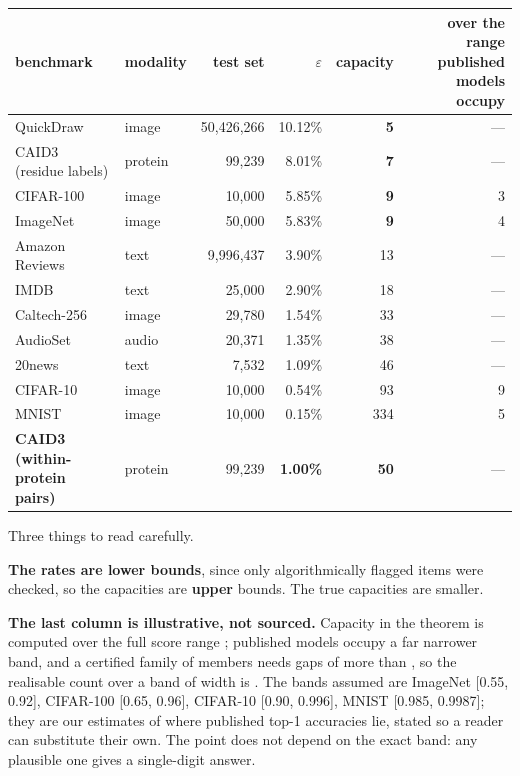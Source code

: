 \begin{center}\footnotesize
\begin{tabular}{llrrrr}
\toprule
\textbf{benchmark} & \textbf{modality} & \textbf{test set} & \textbf{$\varepsilon$} & \textbf{\textbf{capacity}} & \textbf{over the range published models occupy} \\
\midrule
QuickDraw & image & 50,426,266 & 10.12\% & \textbf{5} & --- \\
CAID3 (residue labels) & protein & 99,239 & 8.01\% & \textbf{7} & --- \\
CIFAR-100 & image & 10,000 & 5.85\% & \textbf{9} & 3 \\
ImageNet & image & 50,000 & 5.83\% & \textbf{9} & 4 \\
Amazon Reviews & text & 9,996,437 & 3.90\% & 13 & --- \\
IMDB & text & 25,000 & 2.90\% & 18 & --- \\
Caltech-256 & image & 29,780 & 1.54\% & 33 & --- \\
AudioSet & audio & 20,371 & 1.35\% & 38 & --- \\
20news & text & 7,532 & 1.09\% & 46 & --- \\
CIFAR-10 & image & 10,000 & 0.54\% & 93 & 9 \\
MNIST & image & 10,000 & 0.15\% & 334 & 5 \\
\textbf{CAID3 (within-protein pairs)} & protein & 99,239 & \textbf{1.00\%} & \textbf{50} & --- \\
\bottomrule
\end{tabular}
\end{center}

Three things to read carefully.

\textbf{The rates are lower bounds}, since only algorithmically flagged items were
checked, so the capacities are \textbf{upper} bounds. The true capacities are
smaller.

\textbf{The last column is illustrative, not sourced.} Capacity in the theorem is
computed over the full score range \code{[0,1]}; published models occupy a far
narrower band, and a certified family of  members needs  gaps of more
than , so the realisable count over a band of width  is
. The bands assumed are ImageNet [0.55, 0.92], CIFAR-100
[0.65, 0.96], CIFAR-10 [0.90, 0.996], MNIST [0.985, 0.9987]; they are our
estimates of where published top-1 accuracies lie, stated so a reader can
substitute their own. The point does not depend on the exact band: any plausible
one gives a single-digit answer.

